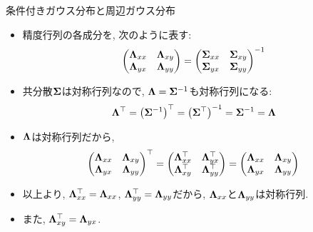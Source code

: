 \documentclass[dvipdfmx,notheorems,t]{beamer}
\begin{document}
\begin{frame}{条件付きガウス分布と周辺ガウス分布}
\begin{itemize}
  \item 精度行列の各成分を, 次のように表す:
  \begin{align*}
    \mqty(\vb{\Lambda}_{xx} & \vb{\Lambda}_{xy} \\
      \vb{\Lambda}_{yx} & \vb{\Lambda}_{yy})
      = \mqty(\vb{\Sigma}_{xx} & \vb{\Sigma}_{xy} \\
        \vb{\Sigma}_{yx} & \vb{\Sigma}_{yy})^{-1}
  \end{align*}
  \item 共分散$\vb{\Sigma}$は対称行列なので, $\vb{\Lambda} = \vb{\Sigma}^{-1}$も対称行列になる:
  \begin{align*}
    \vb{\Lambda}^\top = \left( \vb{\Sigma}^{-1} \right)^\top
      = \left( \vb{\Sigma}^\top \right)^{-1} = \vb{\Sigma}^{-1} = \vb{\Lambda}
  \end{align*}
  \item $\vb{\Lambda}$は対称行列だから,
  \begin{align*}
    \mqty(\vb{\Lambda}_{xx} & \vb{\Lambda}_{xy} \\
      \vb{\Lambda}_{yx} & \vb{\Lambda}_{yy})^\top
    = \mqty(\vb{\Lambda}_{xx}^\top & \vb{\Lambda}_{yx}^\top \\
      \vb{\Lambda}_{xy}^\top & \vb{\Lambda}_{yy}^\top)
    = \mqty(\vb{\Lambda}_{xx} & \vb{\Lambda}_{xy} \\
      \vb{\Lambda}_{yx} & \vb{\Lambda}_{yy})
  \end{align*}
  \item 以上より, $\vb{\Lambda}_{xx}^\top = \vb{\Lambda}_{xx}$, $\vb{\Lambda}_{yy}^\top = \vb{\Lambda}_{yy}$だから,
  $\vb{\Lambda}_{xx}$と$\vb{\Lambda}_{yy}$は対称行列.
  \item また, $\vb{\Lambda}_{xy}^\top = \vb{\Lambda}_{yx}$.
\end{itemize}
\end{frame}
\end{document}
